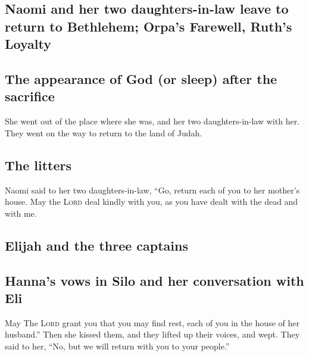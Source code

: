\hypertarget{naomi-and-her-two-daughters-in-law-leave-to-return-to-bethlehem-orpas-farewell-ruths-loyalty}{%
\subsection{Naomi and her two daughters-in-law leave to return to
Bethlehem; Orpa's Farewell, Ruth's
Loyalty}\label{naomi-and-her-two-daughters-in-law-leave-to-return-to-bethlehem-orpas-farewell-ruths-loyalty}}

\hypertarget{the-appearance-of-god-or-sleep-after-the-sacrifice}{%
\subsection{The appearance of God (or sleep) after the
sacrifice}\label{the-appearance-of-god-or-sleep-after-the-sacrifice}}

 She went out of the place where she was, and her two
daughters-in-law with her. They went on the way to return to the land of
Judah.

\hypertarget{the-litters}{%
\subsection{The litters}\label{the-litters}}

 Naomi said to her two daughters-in-law, ``Go, return each
of you to her mother's house. May the \textsc{Lord} deal kindly with
you, as you have dealt with the dead and with me.

\hypertarget{elijah-and-the-three-captains}{%
\subsection{Elijah and the three
captains}\label{elijah-and-the-three-captains}}

\hypertarget{hannas-vows-in-silo-and-her-conversation-with-eli}{%
\subsection{Hanna's vows in Silo and her conversation with
Eli}\label{hannas-vows-in-silo-and-her-conversation-with-eli}}

 May The \textsc{Lord} grant you that you may find rest,
each of you in the house of her husband.'' Then she kissed them, and
they lifted up their voices, and wept.  They said to her,
``No, but we will return with you to your people.''

